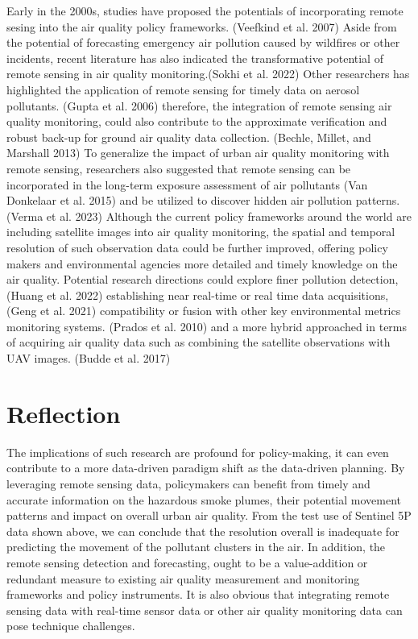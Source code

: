 \documentclass[
  letterpaper,
  DIV=11,
  numbers=noendperiod]{scrreprt}
\begin{document}
Early in the 2000s, studies have proposed the potentials of
incorporating remote sesing into the air quality policy frameworks.
(Veefkind et al. 2007) Aside from the potential of forecasting emergency
air pollution caused by wildfires or other incidents, recent literature
has also indicated the transformative potential of remote sensing in air
quality monitoring.(Sokhi et al. 2022) Other researchers has highlighted
the application of remote sensing for timely data on aerosol pollutants.
(Gupta et al. 2006) therefore, the integration of remote sensing air
quality monitoring, could also contribute to the approximate
verification and robust back-up for ground air quality data collection.
(Bechle, Millet, and Marshall 2013) To generalize the impact of urban
air quality monitoring with remote sensing, researchers also suggested
that remote sensing can be incorporated in the long-term exposure
assessment of air pollutants (Van Donkelaar et al. 2015) and be utilized
to discover hidden air pollution patterns. (Verma et al. 2023) Although
the current policy frameworks around the world are including satellite
images into air quality monitoring, the spatial and temporal resolution
of such observation data could be further improved, offering policy
makers and environmental agencies more detailed and timely knowledge on
the air quality. Potential research directions could explore finer
pollution detection,(Huang et al. 2022) establishing near real-time or
real time data acquisitions,(Geng et al. 2021) compatibility or fusion
with other key environmental metrics monitoring systems. (Prados et al.
2010) and a more hybrid approached in terms of acquiring air quality
data such as combining the satellite observations with UAV images.
(Budde et al. 2017)

\hypertarget{reflection-1}{%
\section*{Reflection}\label{reflection-1}}


The implications of such research are profound for policy-making, it can
even contribute to a more data-driven paradigm shift as the data-driven
planning. By leveraging remote sensing data, policymakers can benefit
from timely and accurate information on the hazardous smoke plumes,
their potential movement patterns and impact on overall urban air
quality. From the test use of Sentinel 5P data shown above, we can
conclude that the resolution overall is inadequate for predicting the
movement of the pollutant clusters in the air. In addition, the remote
sensing detection and forecasting, ought to be a value-addition or
redundant measure to existing air quality measurement and monitoring
frameworks and policy instruments. It is also obvious that integrating
remote sensing data with real-time sensor data or other air quality
monitoring data can pose technique challenges.
\end{document}
